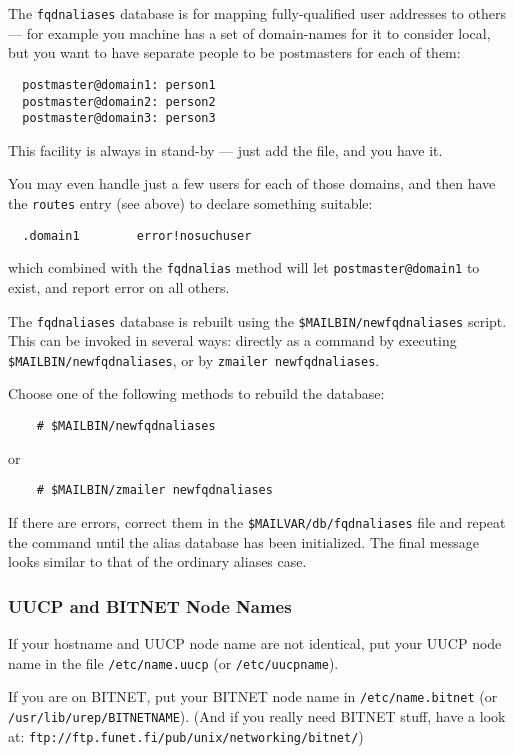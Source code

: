 \begin{description}
The {\tt fqdnaliases} database is for mapping fully-qualified user
addresses to others --- for example you machine has a set of
domain-names for it to consider local, but you want to have
separate people to be postmasters for each of them:
\begin{verbatim}
  postmaster@domain1: person1
  postmaster@domain2: person2
  postmaster@domain3: person3
\end{verbatim}

This facility is always in stand-by --- just add the file, and
you have it.

You may even handle just a few users for each of those domains, and
then have the {\tt routes} entry (see above) to declare something suitable:
\begin{verbatim}
  .domain1        error!nosuchuser
\end{verbatim}

which combined with the {\tt fqdnalias} method will let
{\tt postmaster@domain1} to exist, and report error on all others.

The {\tt fqdnaliases} database is rebuilt using
the {\tt \$MAILBIN/newfqdnaliases} script.
This can be invoked in several ways: directly as a command
by executing {\tt \$MAILBIN/newfqdnaliases}, or
by {\tt zmailer newfqdnaliases}.

Choose one of the following methods to rebuild the database:
\begin{verbatim}
    # $MAILBIN/newfqdnaliases
\end{verbatim}
or
\begin{verbatim}
    # $MAILBIN/zmailer newfqdnaliases
\end{verbatim}

If there are errors, correct them in the {\tt \$MAILVAR/db/fqdnaliases} file
and repeat the command until the alias database has been initialized.
The final message looks similar to that of the ordinary aliases case.
\end{description}



\subsubsection{UUCP and BITNET Node Names}

If your hostname and UUCP node name are not identical, put your
UUCP node name in the file {\tt /etc/name.uucp} (or {\tt /etc/uucpname}).

If you are on BITNET, put your BITNET node name in {\tt /etc/name.bitnet}
(or {\tt /usr/lib/urep/BITNETNAME}). (And if you really need BITNET stuff, have a look at:
{\tt ftp://ftp.funet.fi/pub/unix/networking/bitnet/})




